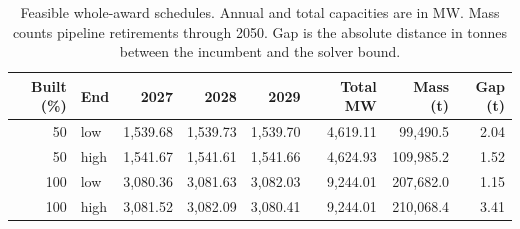 \begin{table}[htbp]\centering\small
\caption{Feasible whole-award schedules. Annual and total capacities are in MW. Mass counts pipeline retirements through 2050. Gap is the absolute distance in tonnes between the incumbent and the solver bound.}\label{tab:binary}
\begin{tabular}{rlrrrrrr}\toprule
Built (\%) & End & 2027 & 2028 & 2029 & Total MW & Mass (t) & Gap (t) \\
\midrule
50 & low & 1,539.68 & 1,539.73 & 1,539.70 & 4,619.11 & 99,490.5 & 2.04 \\
50 & high & 1,541.67 & 1,541.61 & 1,541.66 & 4,624.93 & 109,985.2 & 1.52 \\
100 & low & 3,080.36 & 3,081.63 & 3,082.03 & 9,244.01 & 207,682.0 & 1.15 \\
100 & high & 3,081.52 & 3,082.09 & 3,080.41 & 9,244.01 & 210,068.4 & 3.41 \\
\bottomrule\end{tabular}\end{table}
